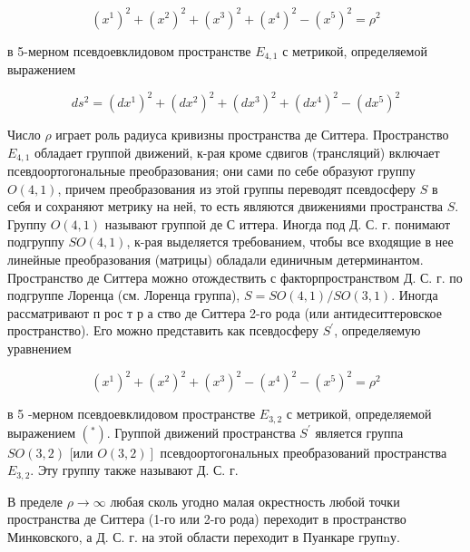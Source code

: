 \documentclass[10pt]{article}
\begin{document}
\[

\left(x^{1}\right)^{2}+\left(x^{2}\right)^{2}+\left(x^{3}\right)^{2}+\left(x^{4}\right)^{2}-\left(x^{5}\right)^{2}=\rho^{2}

\]



в 5-мерном псевдоевклидовом пространстве $E_{4,1}$ с метрикой, определяемой выражением



\[

d s^{2}=\left(d x^{1}\right)^{2}+\left(d x^{2}\right)^{2}+\left(d x^{3}\right)^{2}+\left(d x^{4}\right)^{2}-\left(d x^{5}\right)^{2}

\]



Число $\rho$ играет роль радиуса кривизны пространства де Ситтера. Пространство $E_{4,1}$ обладает группой движений, к-рая кроме сдвигов (трансляций) включает псевдоортогональные преобразования; они сами по себе образуют группу $O(4,1)$, причем преобразования из этой группы переводят псевдосферу $S$ в себя и сохраняют метрику на ней, то есть являются движениями пространства $S$. Группу $O(4,1)$ называют группой де С иттера. Иногда под Д. С. г. понимают подгруппу $S O(4,1)$, к-рая выделяется требованием, чтобы все входящие в нее линейные преобразования (матрицы) обладали единичным детерминантом. Пространство де Ситтера можно отождествить с факторпространством Д. С. г. по подгруппе Лоренца (см. Лоренца группа), $S=S O(4,1) / S O(3,1)$. Иногда рассматривают п рос т р а ство де Ситтера 2-го рода (или антидеситтеровское пространство). Его можно представить как псевдосферу $S^{\prime}$, определяемую уравнением



\[

\left(x^{1}\right)^{2}+\left(x^{2}\right)^{2}+\left(x^{3}\right)^{2}-\left(x^{4}\right)^{2}-\left(x^{5}\right)^{2}=\rho^{2}

\]



в 5 -мерном псевдоевклидовом пространстве $E_{3,2}$ с метрикой, определяемой выражением $\left({ }^{*}\right)$. Группой движений пространства $S^{\prime}$ является группа $S O(3,2)$ [или $\left.O(3,2)\right]$ псевдоортогональных преобразований пространства $E_{3,2}$. Эту группу также называют Д. С. г.



В пределе $\rho \rightarrow \infty$ любая сколь угодно малая окрестность любой точки пространства де Ситтера (1-го или 2-го рода) переходит в пространство Минковского, а Д. С. г. на этой области переходит в Пуанкаре групnу.
\end{document}
